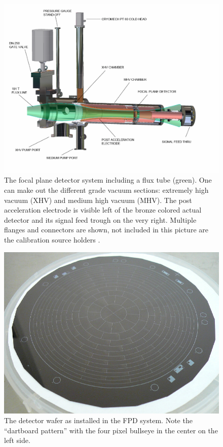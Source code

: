       
      \begin{figure}
      \centering
	\includegraphics[width = 0.8 \textwidth]{graphics/katrinExperiment/detectorHousing.pdf}
	\caption[Focal plane detector system]{The focal plane detector system including a flux tube (green). One can make out the different grade vacuum sections: extremely high vacuum (XHV) and medium high vacuum (MHV). The post acceleration electrode is visible left of the bronze colored actual detector and its signal feed trough on the very right. Multiple flanges and connectors are shown, not included in this picture are the calibration source holders \cite{FPD}.}
	\label{fig:katrinExperiment:detectorHousing}
      \end{figure}
      
      \begin{figure}
      \centering
      	\includegraphics[width = 0.7 \textwidth]{graphics/katrinExperiment/detectorWafer.jpg}
	  \caption[Detector wafer]{The detector wafer as installed in the FPD system. Note the ``dartboard pattern'' with the four pixel bullseye in the center on the left side.}
	  \label{fig:katrinExperiment:detectorWafer}
      \end{figure}
      
